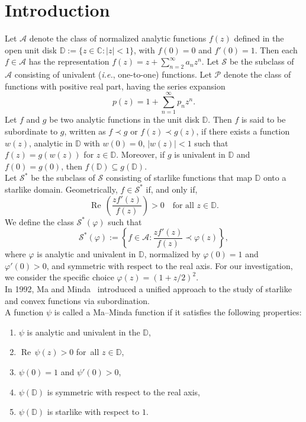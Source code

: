 \documentclass[a4paper,12pt,reqno]{amsart} %
\numberwithin{equation}{section}
\theoremstyle{definition}
\begin{document}
\section{Introduction}
Let $\mathcal{A}$ denote the class of normalized analytic functions $f(z)$ defined in the open unit disk $\mathbb{D} := \{ z \in \mathbb{C} : |z| < 1 \}$, with $f(0)=0$ and $f'(0)=1$. Then each $f \in \mathcal{A}$ has the representation
$
f(z) = z + \sum_{n=2}^{\infty} a_n z^n .
$
Let $\mathcal{S}$ be the subclass of $\mathcal{A}$ consisting of univalent (\textit{i.e.}, one-to-one) functions. Let $\mathcal{P}$ denote the class of functions with positive real part, having the series expansion
\[
p(z) = 1 + \sum_{n=1}^{\infty} p_n z^n .
\]
Let $f$ and $g$ be two analytic functions in the unit disk $%
\mathbb{D}$. Then $f$ is said to be subordinate to $g$, written as $f\prec g$
or $f(z)\prec g(z)$, if there exists a function $w(z)$, analytic in $%
\mathbb{D}$ with $w(0)=0$, $|w(z)|<1$ such that $f(z)=g(w(z))$ for $z\in%
\mathbb{D}$. Moreover, if $g$ is univalent in $\mathbb{D}$ and $f(0)=g(0)$,
then $f(\mathbb{D})\subseteq g(\mathbb{D})$.\\[2mm]
Let $\mathcal{S}^*$ be the subclass of $\mathcal{S}$ consisting of starlike functions that map $\mathbb{D}$ onto a starlike domain. Geometrically, $f \in \mathcal{S}^*$ if, and only if,
\[
\operatorname{Re}\, \!\left( \frac{z f'(z)}{f(z)} \right) > 0 \quad \mbox{for all } z \in \mathbb{D}.
\]
We define the class $\mathcal{S}^*(\varphi)$ such that
\[
\mathcal{S}^*(\varphi) := \left\{ f \in \mathcal{A} : \frac{z f'(z)}{f(z)} \prec \varphi(z) \right\},
\]
where $\varphi$ is analytic and univalent in $\mathbb{D}$, normalized by $\varphi(0) = 1$ and $\varphi'(0) > 0$, and symmetric with respect to the real axis.  For our investigation, we consider the specific choice $\varphi(z) = \left(1 + z/2 \right)^2$.\\[2mm]
In 1992, Ma and Minda~\cite{MaMinda1992} introduced a unified approach to the study of starlike and convex functions via subordination.\\[2pt]
A function $\psi$ is called a {Ma--Minda function} if it satisfies the following properties:
\begin{enumerate}
\item $\psi$ is analytic and univalent in the $\mathbb{D}$,
\item $\operatorname{Re}\, \psi(z)>0$ \mbox{for all} $z\in\mathbb{D}$,
\item $\psi(0)=1$ and $\psi'(0)>0$,
\item $\psi(\mathbb{D})$ is symmetric with respect to the real axis,
\item $\psi(\mathbb{D})$ is starlike with respect to $1$.
\end{enumerate}
\end{document}
